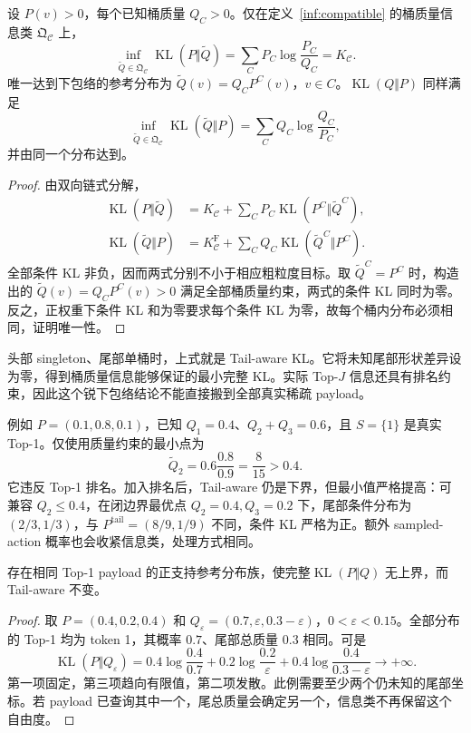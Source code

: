 \documentclass[lang=cn,scheme=chinese,openany]{../book/elegantbook}
\newcommand{\KL}{\operatorname{KL}}
\newcommand{\tail}{\mathrm{tail}}
\begin{document}
\begin{theorem}
\label{inf:lower-envelope}
设 $P(v)>0$，每个已知桶质量 $Q_C>0$。仅在定义~\ref{inf:compatible} 的桶质量信息类 $\mathfrak Q_{\mathcal C}$ 上，
\begin{equation}
\inf_{\widetilde Q\in\mathfrak Q_{\mathcal C}}\KL(P\Vert\widetilde Q)
=\sum_CP_C\log\frac{P_C}{Q_C}=K_{\mathcal C}.
\end{equation}
唯一达到下包络的参考分布为 $\widetilde Q(v)=Q_CP^C(v)$，$v\in C$。$\KL(Q\Vert P)$ 同样满足
\begin{equation}
\inf_{\widetilde Q\in\mathfrak Q_{\mathcal C}}\KL(\widetilde Q\Vert P)
=\sum_CQ_C\log\frac{Q_C}{P_C},
\end{equation}
并由同一个分布达到。
\end{theorem}
\begin{proof}
由双向链式分解，
\begin{align}
\KL(P\Vert\widetilde Q)&=K_{\mathcal C}+\sum_CP_C\KL(P^C\Vert\widetilde Q^C),\\
\KL(\widetilde Q\Vert P)&=K^{\mathrm F}_{\mathcal C}+\sum_CQ_C\KL(\widetilde Q^C\Vert P^C).
\end{align}
全部条件 KL 非负，因而两式分别不小于相应粗粒度目标。取 $\widetilde Q^C=P^C$ 时，构造出的 $\widetilde Q(v)=Q_CP^C(v)>0$ 满足全部桶质量约束，两式的条件 KL 同时为零。反之，正权重下条件 KL 和为零要求每个条件 KL 为零，故每个桶内分布必须相同，证明唯一性。
\end{proof}

头部 singleton、尾部单桶时，上式就是 Tail-aware KL。它将未知尾部形状差异设为零，得到桶质量信息能够保证的最小完整 KL。实际 Top-$J$ 信息还具有排名约束，因此这个锐下包络结论不能直接搬到全部真实稀疏 payload。

例如 $P=(0.1,0.8,0.1)$，已知 $Q_1=0.4$、$Q_2+Q_3=0.6$，且 $S=\{1\}$ 是真实 Top-1。仅使用质量约束的最小点为
\begin{equation}
\widetilde Q_2=0.6\frac{0.8}{0.9}=\frac8{15}>0.4.
\end{equation}
它违反 Top-1 排名。加入排名后，Tail-aware 仍是下界，但最小值严格提高：可兼容 $Q_2\leq0.4$，在闭边界最优点 $Q_2=0.4,Q_3=0.2$ 下，尾部条件分布为 $(2/3,1/3)$，与 $P^\tail=(8/9,1/9)$ 不同，条件 KL 严格为正。额外 sampled-action 概率也会收紧信息类，处理方式相同。

\begin{proposition}[相同稀疏观测不控制完整$\KL(P\Vert Q)$ 的上界]
\label{inf:unbounded}
存在相同 Top-1 payload 的正支持参考分布族，使完整$\KL(P\Vert Q)$ 无上界，而 Tail-aware 不变。
\end{proposition}
\begin{proof}
取 $P=(0.4,0.2,0.4)$ 和 $Q_\varepsilon=(0.7,\varepsilon,0.3-\varepsilon)$，$0<\varepsilon<0.15$。全部分布的 Top-1 均为 token 1，其概率 $0.7$、尾部总质量 $0.3$ 相同。可是
\begin{equation}
\KL(P\Vert Q_\varepsilon)
=0.4\log\frac{0.4}{0.7}+0.2\log\frac{0.2}{\varepsilon}
+0.4\log\frac{0.4}{0.3-\varepsilon}\longrightarrow+\infty.
\end{equation}
第一项固定，第三项趋向有限值，第二项发散。此例需要至少两个仍未知的尾部坐标。若 payload 已查询其中一个，尾总质量会确定另一个，信息类不再保留这个自由度。
\end{proof}
\end{document}
